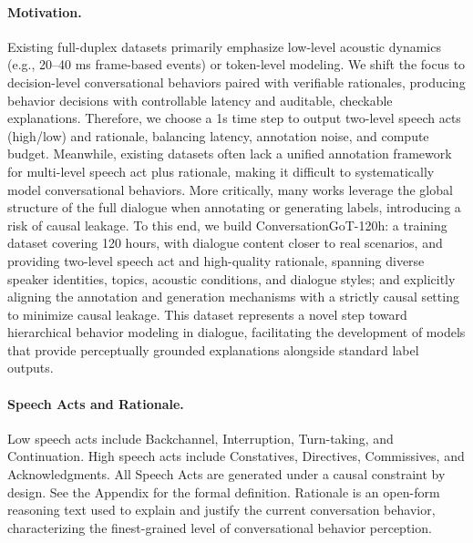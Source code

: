 \paragraph{Motivation. } Existing full-duplex datasets primarily emphasize low-level acoustic dynamics (e.g., 20–40 ms frame-based events) or token-level modeling. We shift the focus to decision-level conversational behaviors paired with verifiable rationales, producing behavior decisions with controllable latency and auditable, checkable explanations. Therefore, we choose a 1s time step to output two-level speech acts (high/low) and rationale, balancing latency, annotation noise, and compute budget. Meanwhile, existing datasets often lack a unified annotation framework for multi-level speech act plus rationale, making it difficult to systematically model conversational behaviors. More critically, many works leverage the global structure of the full dialogue when annotating or generating labels, introducing a risk of causal leakage. To this end, we build ConversationGoT-120h: a training dataset covering 120 hours, with dialogue content closer to real scenarios, and providing two-level speech act and high-quality rationale, spanning diverse speaker identities, topics, acoustic conditions, and dialogue styles; and explicitly aligning the annotation and generation mechanisms with a strictly causal setting to minimize causal leakage. This dataset represents a novel step toward hierarchical behavior modeling in dialogue, facilitating the development of models that provide perceptually grounded explanations alongside standard label outputs.
\paragraph{Speech Acts and Rationale.} 
Low speech acts include Backchannel, Interruption, Turn-taking, and Continuation. High speech acts include Constatives, Directives, Commissives, and Acknowledgments. All Speech Acts are generated under a causal constraint by design. See the Appendix for the formal definition. Rationale is an open-form reasoning text used to explain and justify the current conversation behavior, characterizing the finest-grained level of conversational behavior perception.

